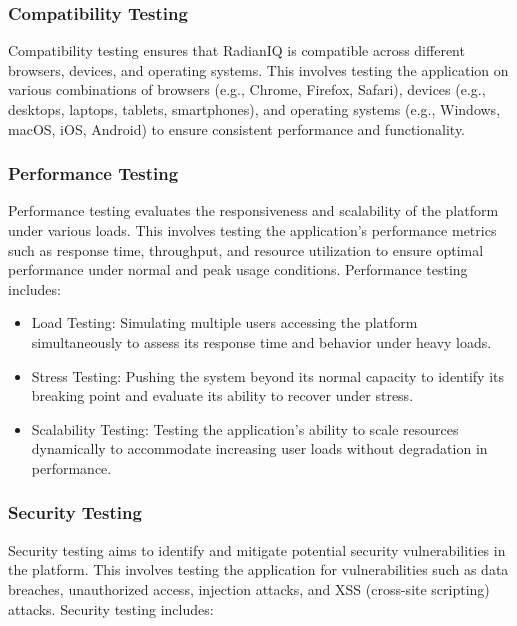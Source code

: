 		\subsubsection{Compatibility Testing}
		
		Compatibility testing ensures that RadianIQ is compatible across different browsers, devices, and operating systems. This involves testing the application on various combinations of browsers (e.g., Chrome, Firefox, Safari), devices (e.g., desktops, laptops, tablets, smartphones), and operating systems (e.g., Windows, macOS, iOS, Android) to ensure consistent performance and functionality.
		
		\subsubsection{Performance Testing}
		
		Performance testing evaluates the responsiveness and scalability of the platform under various loads. This involves testing the application's performance metrics such as response time, throughput, and resource utilization to ensure optimal performance under normal and peak usage conditions. Performance testing includes:
		
		\begin{itemize}
			\item Load Testing: Simulating multiple users accessing the platform simultaneously to assess its response time and behavior under heavy loads.
			\item Stress Testing: Pushing the system beyond its normal capacity to identify its breaking point and evaluate its ability to recover under stress.
			\item Scalability Testing: Testing the application's ability to scale resources dynamically to accommodate increasing user loads without degradation in performance.
		\end{itemize}
		
		\subsubsection{Security Testing}
		
		Security testing aims to identify and mitigate potential security vulnerabilities in the platform. This involves testing the application for vulnerabilities such as data breaches, unauthorized access, injection attacks, and XSS (cross-site scripting) attacks. Security testing includes:
		

